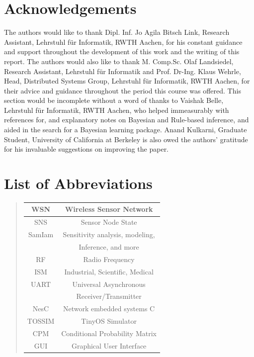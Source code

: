 \documentclass{sig-alternate-10pt}
\begin{document}
\section{Acknowledgements}

The authors would like to thank Dipl. Inf. Jo Agila Bitsch Link, Research 
Assistant, Lehrstuhl f\"ur Informatik, RWTH Aachen, for his constant guidance 
and support throughout the development of this work and the writing of this 
report. The authors would also like to thank M. Comp.Sc. Olaf Landsiedel, 
Research Assistant, Lehrstuhl f\"ur Informatik and Prof. Dr-Ing. Klaus Wehrle, Head, 
Distributed Systems Group, Lehrstuhl f\"ur Informatik, RWTH Aachen, for their 
advice and guidance throughout the period this course was offered. This section 
would be incomplete without a word of thanks to Vaishak Belle, Lehrstuhl f\"ur 
Informatik, RWTH Aachen, who helped immeasurably with references for, and 
explanatory notes on Bayesian and Rule-based inference, and aided in the search 
for a Bayesian learning package. Anand Kulkarni, Graduate Student, University of
California at Berkeley is also owed the authors' gratitude for his invaluable 
suggestions on improving the paper.
 
\section{List of Abbreviations}

\begin{quote}
\begin{tabular}{|c|c|}
\hline
WSN & Wireless Sensor Network \\
\hline 
SNS & Sensor Node State\\ 
\hline
SamIam & Sensitivity analysis, modeling,\\
  & Inference, and more \\
  \hline
RF & Radio Frequency\\
\hline
ISM & Industrial, Scientific, Medical \\
\hline
UART & Universal Asynchronous \\
 & Receiver/Transmitter \\
 \hline
NesC & Network embedded systems C \\
\hline
TOSSIM & TinyOS Simulator \\
\hline
CPM & Conditional Probability Matrix \\
\hline
GUI & Graphical User Interface \\
\hline
\end{tabular}
\end{quote}
\end{document}
